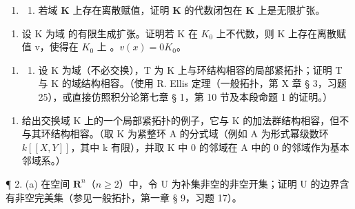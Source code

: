\begin{enumerate}
\def\labelenumi{\arabic{enumi}.}
\setcounter{enumi}{21}
\tightlist
\item
  \begin{enumerate}
  \def\labelenumii{(\alph{enumii})}
  \tightlist
  \item
    若域 \(\mathbf{K}\) 上存在离散赋值，证明 \(\mathbf{K}\) 的代数闭包在 \(\mathbf{K}\) 上是无限扩张。
  \end{enumerate}
\end{enumerate}

\begin{enumerate}
\def\labelenumi{(\alph{enumi})}
\setcounter{enumi}{1}
\tightlist
\item
  设 K 为域  的有限生成扩张。证明若 K 在 \(K_{0}\) 上不代数，则 K 上存在离散赋值 v，使得在 \(K_{0}\) 上 。\(v(x) = 0\)\(K_{0}\)。
\end{enumerate}


\begin{enumerate}
\def\labelenumi{\arabic{enumi}.}
\tightlist
\item
  \begin{enumerate}
  \def\labelenumii{(\alph{enumii})}
  \tightlist
  \item
    设 K 为域（不必交换），T 为 K 上与环结构相容的局部紧拓扑；证明 T 与 K 的域结构相容。（使用 R. Ellis 定理（一般拓扑，第 X 章 § 3，习题 25），或直接仿照积分论第七章 § 1，第 10 节及本段命题 1 的证明。）
  \end{enumerate}
\end{enumerate}

\begin{enumerate}
\def\labelenumi{(\alph{enumi})}
\setcounter{enumi}{1}
\tightlist
\item
  给出交换域 K 上的一个局部紧拓扑的例子，它与 K 的加法群结构相容，但不与其环结构相容。（取 K 为紧整环 A 的分式域（例如 A 为形式幂级数环 \(k[[X, Y]]\)，其中 k 有限），并取 K 中 0 的邻域在 A 中的 0 的邻域作为基本邻域系。）
\end{enumerate}

¶ 2. (a) 在空间 \(\mathbf{R}^n\)（\(n \geqslant 2\)）中，令 U 为补集非空的非空开集；证明 U 的边界含有非空完美集（参见一般拓扑，第一章 § 9，习题 17）。

